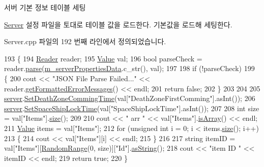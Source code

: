 서버 기본 정보 테이블 세팅 

\hyperlink{class_server}{Server} 설정 파일을 토대로 테이블 값을 로드한다.  기본값을 로드해 세팅한다. 

Server.\+cpp 파일의 192 번째 라인에서 정의되었습니다.


\begin{DoxyCode}
193 \{
194     \hyperlink{class_json_1_1_reader}{Reader} reader;
195     \hyperlink{class_json_1_1_value}{Value} val;
196     \textcolor{keywordtype}{bool} parseCheck = reader.\hyperlink{class_json_1_1_reader_af1da6c976ad1e96c742804c3853eef94}{parse}(\hyperlink{class_server_ae4a69c37027fd029b43099469ae00ad8}{m\_serverPropertiesData}.c\_str(), val);
197 
198     \textcolor{keywordflow}{if} (!parseCheck)
199     \{
200         cout << \textcolor{stringliteral}{"JSON File Parse Failed..."} << reader.\hyperlink{class_json_1_1_reader_ae638a7b1f36f7ccf99ba89fa36ccf222}{getFormattedErrorMessages}() 
      << endl;
201         \textcolor{keywordflow}{return} \textcolor{keyword}{false};
202     \}
203 
204 
205     \hyperlink{_server_8cpp_afd1a82c786509e03b540bae82af2c137}{server}.\hyperlink{class_server_a0c817a017f9b2cb6f92de01e693b8e35}{SetDeathZoneCommingTime}(val[\textcolor{stringliteral}{"DeathZoneFirstComming"}].asInt());
206     \hyperlink{_server_8cpp_afd1a82c786509e03b540bae82af2c137}{server}.\hyperlink{class_server_a3866f3d6a99358d0068cee3d5bc529d2}{SetSpaceShipLockTime}(val[\textcolor{stringliteral}{"SpaceShipLockTime"}].asInt());
207 
208     \textcolor{keywordtype}{int} size = val[\textcolor{stringliteral}{"Items"}].\hyperlink{class_json_1_1_value_a0ec2808e1d7efa4e9fad938d6667be44}{size}();
209 
210     cout << \textcolor{stringliteral}{" arr "} << val[\textcolor{stringliteral}{"Items"}].\hyperlink{class_json_1_1_value_a1627eb9d6568d6d0252fa8bb711c0a59}{isArray}() << endl;
211     \hyperlink{class_json_1_1_value}{Value} items = val[\textcolor{stringliteral}{"Items"}];
212     \textcolor{keywordflow}{for} (\textcolor{keywordtype}{unsigned} \textcolor{keywordtype}{int} i = 0; i < items.\hyperlink{class_json_1_1_value_a0ec2808e1d7efa4e9fad938d6667be44}{size}(); i++)
213     \{
214         cout << val[\textcolor{stringliteral}{"Items"}][i] << endl;
215     \}
216 
217     \textcolor{keywordtype}{string} itemID = val[\textcolor{stringliteral}{"Items"}][\hyperlink{_server_8h_ade3d882172359ea96a915f1cab5f681b}{RandomRange}(0, size)][\textcolor{stringliteral}{"Id"}].\hyperlink{class_json_1_1_value_ae3f9b0d38f820ccdd8888aa92ea6e792}{asString}();
218     cout << \textcolor{stringliteral}{"item ID "} << itemID << endl;
219     \textcolor{keywordflow}{return} \textcolor{keyword}{true};
220 \}
\end{DoxyCode}
